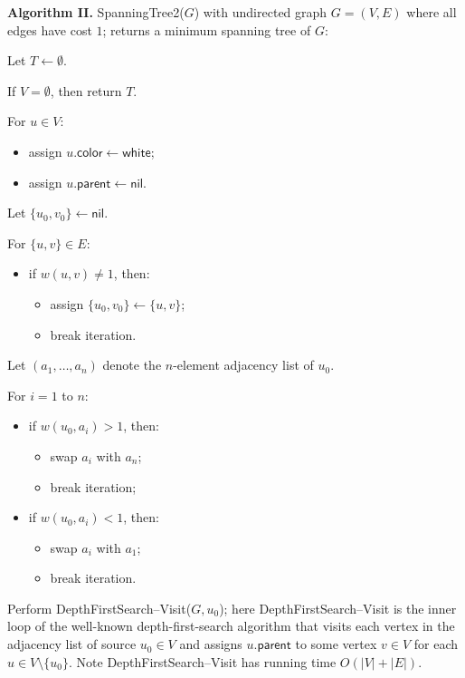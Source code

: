 \begin{enumerate}
\begin{solution}
\textbf{Algorithm II. }{\sc SpanningTree2}($G$) with undirected graph $G=(V,E)$ where all edges have cost $1$; returns a minimum spanning tree of $G$:

Let $T\leftarrow\emptyset$.

If $V=\emptyset$, then return $T$.

For $u\in V$:
\begin{itemize}
    \item assign $u.\mathsf{color}\leftarrow\mathsf{white}$;
    \item assign $u.\mathsf{parent}\leftarrow\mathsf{nil}$.
\end{itemize}

Let $\{u_0,v_0\}\leftarrow\mathsf{nil}$.

For $\{u,v\}\in E$:
\begin{itemize}
    \item if $w(u,v)\neq 1$, then:
    \begin{itemize}
        \item assign $\{u_0,v_0\}\leftarrow\{u,v\}$;
        \item break iteration.
    \end{itemize}
\end{itemize}

Let $(a_1,\dots,a_n)$ denote the $n$-element adjacency list of $u_0$.

For $i=1$ to $n$:
\begin{itemize}
\item if $w(u_0,a_i)>1$, then:
\begin{itemize}
    \item swap $a_i$ with $a_n$;
    \item break iteration;
\end{itemize}
\item if $w(u_0,a_i)<1$, then:
\begin{itemize}
    \item swap $a_i$ with $a_1$;
    \item break iteration.
\end{itemize}
\end{itemize}
Perform {\sc DepthFirstSearch--Visit}($G,u_0$); here {\sc DepthFirstSearch--Visit} is the inner loop of the well-known depth-first-search algorithm that visits each vertex in the adjacency list of source $u_0\in V$ and assigns $u.\mathsf{parent}$ to some vertex $v\in V$ for each $u\in V\setminus\{u_0\}$. Note {\sc DepthFirstSearch--Visit} has running time $O(|V|+|E|)$.


\end{solution}
\end{enumerate}
